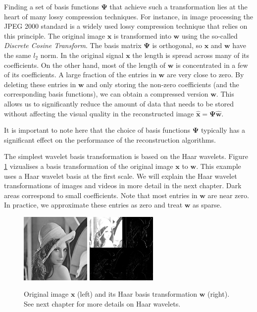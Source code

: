 \documentclass[final,3p]{report}
\let\bs\boldsymbol
\begin{document}
Finding a set of basis functions $\bs\Psi$ that achieve such a transformation lies at the heart of many lossy compression techniques.
For instance, in image processing the JPEG 2000 standard is a widely used lossy compression technique that relies on this principle.
The original image $\bs x$ is transformed into $\bs w$ using the so-called \emph{Discrete Cosine Transform}.
The basis matrix $\bs \Psi$ is orthogonal, so $\bs x$ and $\bs w$ have the same $l_2$ norm.
In the original signal $\bs x$ the length is spread across many of its coefficients.
On the other hand, most of the length of $\bs w$ is concentrated in a few of its coefficients.
A large fraction of the entries in $\bs w$ are very close to zero. 
By deleting these entries in $\bs w$ and only storing the non-zero coefficients (and the corresponding basis functions), we can obtain a compressed version $\hat{\bs w}$. 
This allows us to significantly reduce the amount of data that needs to be stored without affecting the visual quality in the reconstructed image $\hat{\bs x} = \bs\Psi\hat{\bs w}$.

It is important to note here that the choice of basis functions $\bs \Psi$ typically has a significant effect on the performance of the reconstruction algorithms.

The simplest wavelet basis transformation is based on the Haar wavelets.
Figure \ref{fig:haarlenna} vizualises a basis transformation of the original image $\bs x$ to $\bs w$. 
This example uses a Haar wavelet basis at the first scale.
We will explain the Haar wavelet transformations of images and videos in more detail in the next chapter.
Dark areas correspond to small coefficients.
Note that most entries in $\bs w$ are near zero. 
In practice, we approximate these entries as zero and treat $\bs w$ as sparse.

\begin{figure}
\label{fig:haarlenna}
\center
\includegraphics{128.png}
\includegraphics{haar.png}
\caption{Original image $\bs x$ (left) and its Haar basis transformation $\bs w$ (right). See next chapter for more details on Haar wavelets.}
\end{figure}
\end{document}

